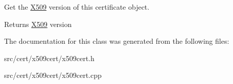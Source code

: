 Get the \hyperlink{namespaceBotan_1_1X509}{X509} version of this certificate object. \begin{DoxyReturn}{Returns}
\hyperlink{namespaceBotan_1_1X509}{X509} version 
\end{DoxyReturn}


The documentation for this class was generated from the following files\-:\begin{DoxyCompactItemize}
\item 
src/cert/x509cert/x509cert.\-h\item 
src/cert/x509cert/x509cert.\-cpp\end{DoxyCompactItemize}
